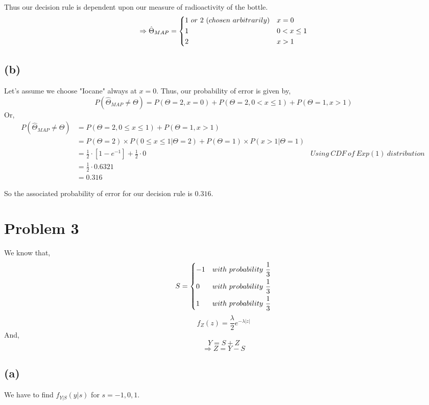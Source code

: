\documentclass{article}
\begin{document}
	Thus our decision rule is dependent upon our measure of radioactivity of the bottle. 
	$$ \Rightarrow \hat\Theta_{MAP} = \begin{dcases}
		1\ or\ 2\ (chosen\ arbitrarily) & x = 0 \\
		1 & 0 < x \leq 1 \\
		2 & x>1
		\end{dcases}
	$$

\subsection*{(b)}
	Let's assume we choose "Iocane" always at $x=0$. Thus, our probability of error is given by,
	$$ P(\hat\Theta_{MAP} \neq \Theta) = P(\Theta=2, x=0) + P(\Theta =2, 0<x\leq 1) + P(\Theta = 1, x>1) $$
	Or,
	$$ \begin{aligned}
		P(\hat\Theta_{MAP} \neq \Theta) & = P(\Theta =2, 0\leq x\leq 1) + P(\Theta = 1, x>1) &  \\
		 & = P(\Theta = 2) \times P(0 \leq x \leq 1 | \Theta =2 ) + P(\Theta = 1) \times P(x> 1 | \Theta =1 ) & \\
		& = \frac{1}{2} \cdot [1-e^{-1}] + \frac{1}{2}\cdot 0 & Using\ CDF\ of\ Exp(1)\ distribution\ \\
		& = \frac{1}{2} \cdot 0.6321 \\
		& = 0.316 
		\end{aligned}
	$$  
\linebreak

	So the associated probability of error for our decision rule is $0.316$.

\section*{Problem 3}
	We know that,
	$$ S = \begin{dcases}
		-1 & with\ probability\ \frac{1}{3} \\
		0 & with\ probability\ \frac{1}{3} \\
		1 & with\ probability\ \frac{1}{3}
		\end{dcases}
	$$
	$$ f_Z (z) = \frac{\lambda}{2} e^{-\lambda |z|} $$
	And, $$ Y = S + Z $$
	$$ \Rightarrow Z = Y - S $$

\subsection*{(a)}
	We have to find $f_{Y|S} (y|s)$ for $s= -1, 0, 1$. \hfill \hfill \linebreak
	
\end{document}
